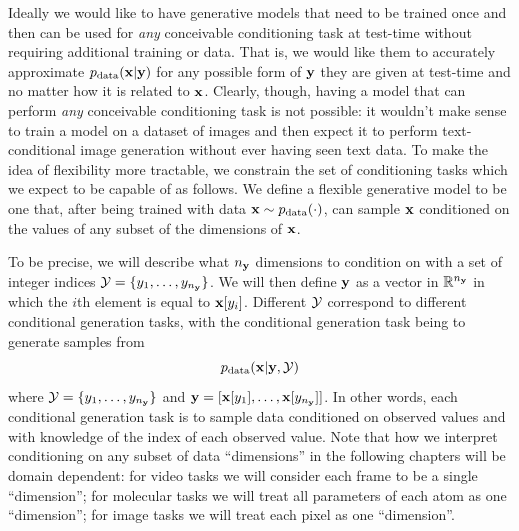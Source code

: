 Ideally we would like to have generative models that need to be trained once and then can be used for \textit{any} conceivable conditioning task at test-time without requiring additional training or data. That is, we would like them to accurately approximate $p_{\rm{data}}({\mathbf{x}}|{\mathbf{y}})$ for any possible form of ${\mathbf{y}}$ they are given at test-time and no matter how it is related to ${\mathbf{x}}$.
Clearly, though, having a model that can perform \textit{any} conceivable conditioning task is not possible: it wouldn't make sense to train a model on a dataset of images and then expect it to perform text-conditional image generation without ever having seen text data. 
%
To make the idea of flexibility more tractable, we constrain the set of conditioning tasks which we expect to be capable of as follows. We define a flexible generative model to be one that, after being trained with data ${\mathbf{x}} \sim p_{\rm{data}}(\cdot)$, can sample ${\mathbf{x}}$ conditioned on the values of any subset of the dimensions of ${\mathbf{x}}$. 

To be precise, we will describe what $n_{\mathbf{y}}$ dimensions to condition on with a set of integer indices ${\mathcal{Y}} = \{ y_1, \ldots, y_{n_{\mathbf{y}}} \}$. We will then define ${\mathbf{y}}$ as a vector in $\mathbb{R}^{n_{\mathbf{y}}}$ in which the $i$th element is equal to ${\mathbf{x}}[y_i]$. Different ${\mathcal{Y}}$ correspond to different conditional generation tasks, with the conditional generation task being to generate samples from
\begin{equation} \label{eq:flexible-diffusion-target}
    p_{\rm{data}}({\mathbf{x}} | {\mathbf{y}}, {\mathcal{Y}})
\end{equation}
where ${\mathcal{Y}} = \{ y_1, \ldots, y_{n_{\mathbf{y}}} \}$ and ${\mathbf{y}} = [ {\mathbf{x}}[y_1], \ldots, {\mathbf{x}}[y_{n_{\mathbf{y}}}] ]$. In other words, each conditional generation task is to sample data conditioned on observed values and with knowledge of the index of each observed value. Note that how we interpret conditioning on any subset of data ``dimensions'' in the following chapters will be domain dependent: for video tasks we will consider each frame to be a single ``dimension''; for molecular tasks we will treat all parameters of each atom as one ``dimension''; for image tasks we will treat each pixel as one ``dimension''. 

